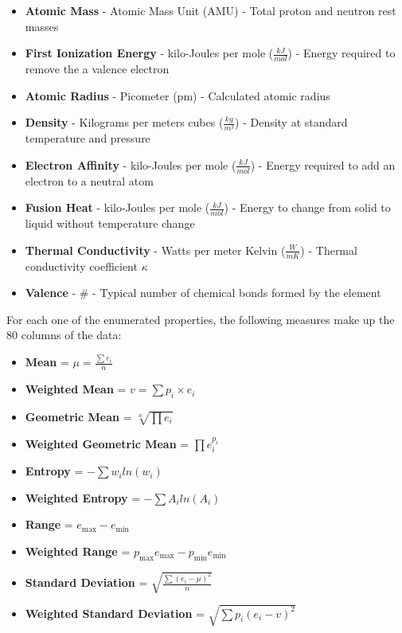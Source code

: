 \documentclass{article}\usepackage[]{graphicx}\usepackage[]{xcolor}
\begin{document}
\begin{itemize}
\item{\textbf{Atomic Mass} - Atomic Mass Unit (AMU) - Total proton and neutron rest masses}
\item{\textbf{First Ionization Energy} - kilo-Joules per mole ($\frac{kJ}{mol}$) - Energy required to remove the a valence electron}
\item{\textbf{Atomic Radius} - Picometer (pm) - Calculated atomic radius}
\item{\textbf{Density} - Kilograms per meters cubes ($\frac{kg}{m^3}$) - Density at standard temperature and pressure}
\item{\textbf{Electron Affinity} - kilo-Joules per mole ($\frac{kJ}{mol}$) - Energy required to add an electron to a neutral atom}
\item{\textbf{Fusion Heat} - kilo-Joules per mole ($\frac{kJ}{mol}$) - Energy to change from solid to liquid without temperature change}
\item{\textbf{Thermal Conductivity} - Watts per meter Kelvin ($\frac{W}{mK}$) - Thermal conductivity coefficient $\kappa$}
\item{\textbf{Valence} - \# - Typical number of chemical bonds formed by the element}
\end{itemize}

For each one of the enumerated properties, the following measures make up the 80 columns of the data:

\begin{itemize}
\item{\textbf{Mean} = $\mu = \frac{\sum{e_i}}{n}$}
\item{\textbf{Weighted Mean} = $v = \sum{p_i\times e_i}$}
\item{\textbf{Geometric Mean} = $\sqrt[n]{\prod{e_i}}$}
\item{\textbf{Weighted Geometric Mean} = $\prod{e_i^{p_i}}$}
\item{\textbf{Entropy} = $-\sum{w_iln(w_i)}$}
\item{\textbf{Weighted Entropy} = $-\sum{A_iln(A_i)}$}
\item{\textbf{Range} = $e_{\mbox{max}} - e_{\mbox{min}}$}
\item{\textbf{Weighted Range} = $p_{\mbox{max}}e_{\mbox{max}} - p_{\mbox{min}}e_{\mbox{min}}$}
\item{\textbf{Standard Deviation} = $\sqrt{\frac{\sum{(e_i - \mu)^2}}{n}}$}
\item{\textbf{Weighted Standard Deviation} = $\sqrt{\sum{p_i(e_i - v)^2}}$}
\end{itemize}
\end{document}
